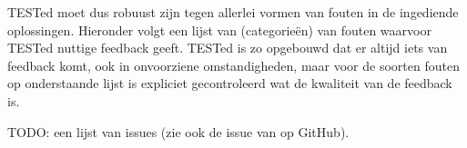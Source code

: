 TESTed moet dus robuust zijn tegen allerlei vormen van fouten in de ingediende oplossingen.
Hieronder volgt een lijst van (categorieën) van fouten waarvoor TESTed nuttige feedback geeft.
TESTed is zo opgebouwd dat er altijd iets van feedback komt, ook in onvoorziene omstandigheden, maar voor de soorten fouten op onderstaande lijst is expliciet gecontroleerd wat de kwaliteit van de feedback is.

TODO: een lijst van issues (zie ook de issue van op GitHub).

